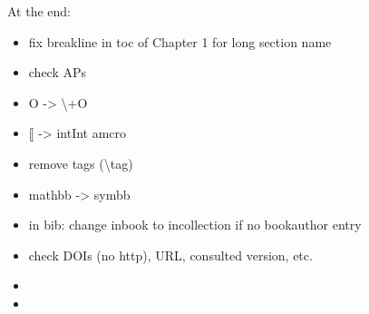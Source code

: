 At the end:
\begin{itemize}
	\item fix breakline in toc of Chapter 1 for long section name
	\item check APs 
	\item O -> \backslash+O
	\item $\lBrack$ -> intInt amcro
	\item remove tags (\textsf{\backslash tag})
	\item mathbb -> symbb
	\item in bib: change inbook to incollection if no bookauthor entry
	\item check DOIs (no http), URL, consulted version, etc.
	\item {}
	\item {}
\end{itemize}
